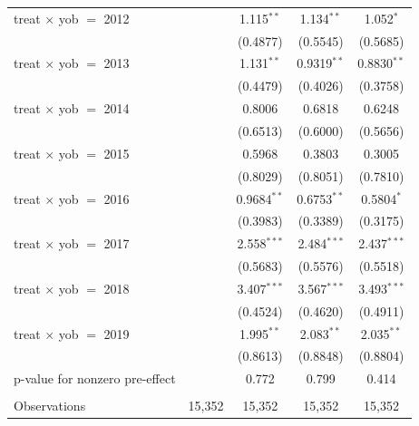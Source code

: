 \begin{table}[htbp]
\begin{tabular}{lcccc}
      treat $\times$ yob $=$ 2012    &               & 1.115$^{**}$   & 1.134$^{**}$   & 1.052$^{*}$\\   
                                     &               & (0.4877)       & (0.5545)       & (0.5685)\\   
      treat $\times$ yob $=$ 2013    &               & 1.131$^{**}$   & 0.9319$^{**}$  & 0.8830$^{**}$\\   
                                     &               & (0.4479)       & (0.4026)       & (0.3758)\\   
      treat $\times$ yob $=$ 2014    &               & 0.8006         & 0.6818         & 0.6248\\   
                                     &               & (0.6513)       & (0.6000)       & (0.5656)\\   
      treat $\times$ yob $=$ 2015    &               & 0.5968         & 0.3803         & 0.3005\\   
                                     &               & (0.8029)       & (0.8051)       & (0.7810)\\   
      treat $\times$ yob $=$ 2016    &               & 0.9684$^{**}$  & 0.6753$^{**}$  & 0.5804$^{*}$\\   
                                     &               & (0.3983)       & (0.3389)       & (0.3175)\\   
      treat $\times$ yob $=$ 2017    &               & 2.558$^{***}$  & 2.484$^{***}$  & 2.437$^{***}$\\   
                                     &               & (0.5683)       & (0.5576)       & (0.5518)\\   
      treat $\times$ yob $=$ 2018    &               & 3.407$^{***}$  & 3.567$^{***}$  & 3.493$^{***}$\\   
                                     &               & (0.4524)       & (0.4620)       & (0.4911)\\   
      treat $\times$ yob $=$ 2019    &               & 1.995$^{**}$   & 2.083$^{**}$   & 2.035$^{**}$\\   
                                     &               & (0.8613)       & (0.8848)       & (0.8804)\\   
      p-value for nonzero pre-effect &               & 0.772          & 0.799          & 0.414\\  
       \\
      Observations                   & 15,352        & 15,352         & 15,352         & 15,352\\  

\end{tabular}
\end{table}
